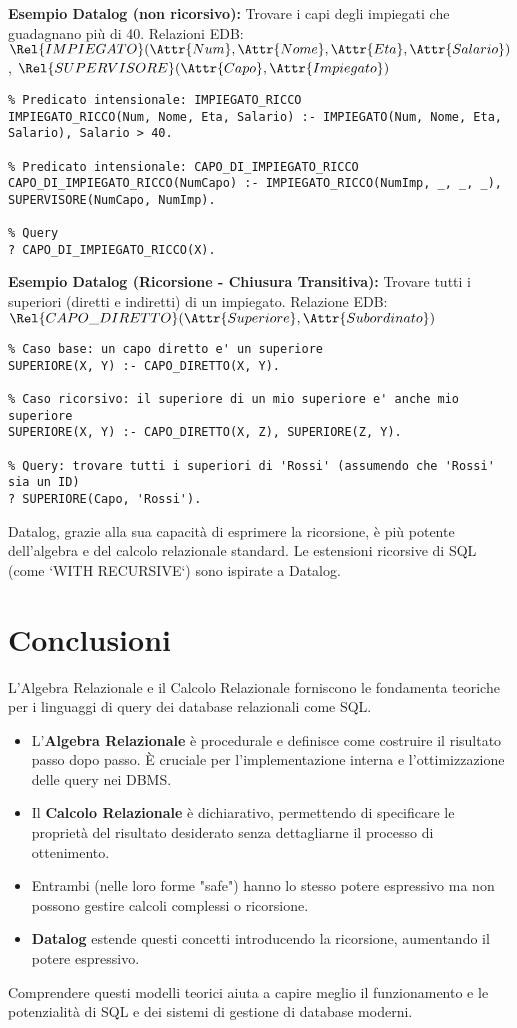 \textbf{Esempio Datalog (non ricorsivo):} Trovare i capi degli impiegati che guadagnano più di 40.
Relazioni EDB: $\Rel{IMPIEGATO}(\Attr{Num}, \Attr{Nome}, \Attr{Eta}, \Attr{Salario})$, $\Rel{SUPERVISORE}(\Attr{Capo}, \Attr{Impiegato})$
\begin{verbatim}
% Predicato intensionale: IMPIEGATO_RICCO
IMPIEGATO_RICCO(Num, Nome, Eta, Salario) :- IMPIEGATO(Num, Nome, Eta, Salario), Salario > 40.

% Predicato intensionale: CAPO_DI_IMPIEGATO_RICCO
CAPO_DI_IMPIEGATO_RICCO(NumCapo) :- IMPIEGATO_RICCO(NumImp, _, _, _),
SUPERVISORE(NumCapo, NumImp).

% Query
? CAPO_DI_IMPIEGATO_RICCO(X).
\end{verbatim}

\textbf{Esempio Datalog (Ricorsione - Chiusura Transitiva):} Trovare tutti i superiori (diretti e indiretti) di un impiegato.
Relazione EDB: $\Rel{CAPO\_DIRETTO}(\Attr{Superiore}, \Attr{Subordinato})$
\begin{verbatim}
% Caso base: un capo diretto e' un superiore
SUPERIORE(X, Y) :- CAPO_DIRETTO(X, Y).

% Caso ricorsivo: il superiore di un mio superiore e' anche mio superiore
SUPERIORE(X, Y) :- CAPO_DIRETTO(X, Z), SUPERIORE(Z, Y).

% Query: trovare tutti i superiori di 'Rossi' (assumendo che 'Rossi' sia un ID)
? SUPERIORE(Capo, 'Rossi').
\end{verbatim}
Datalog, grazie alla sua capacità di esprimere la ricorsione, è più potente dell'algebra e del calcolo relazionale standard. Le estensioni ricorsive di SQL (come `WITH RECURSIVE`) sono ispirate a Datalog.

\section{Conclusioni}
L'Algebra Relazionale e il Calcolo Relazionale forniscono le fondamenta teoriche per i linguaggi di query dei database relazionali come SQL.
\begin{itemize}
	\item L'\textbf{Algebra Relazionale} è procedurale e definisce come costruire il risultato passo dopo passo. È cruciale per l'implementazione interna e l'ottimizzazione delle query nei DBMS.
	\item Il \textbf{Calcolo Relazionale} è dichiarativo, permettendo di specificare le proprietà del risultato desiderato senza dettagliarne il processo di ottenimento.
	\item Entrambi (nelle loro forme "safe") hanno lo stesso potere espressivo ma non possono gestire calcoli complessi o ricorsione.
	\item \textbf{Datalog} estende questi concetti introducendo la ricorsione, aumentando il potere espressivo.
\end{itemize}
Comprendere questi modelli teorici aiuta a capire meglio il funzionamento e le potenzialità di SQL e dei sistemi di gestione di database moderni.

